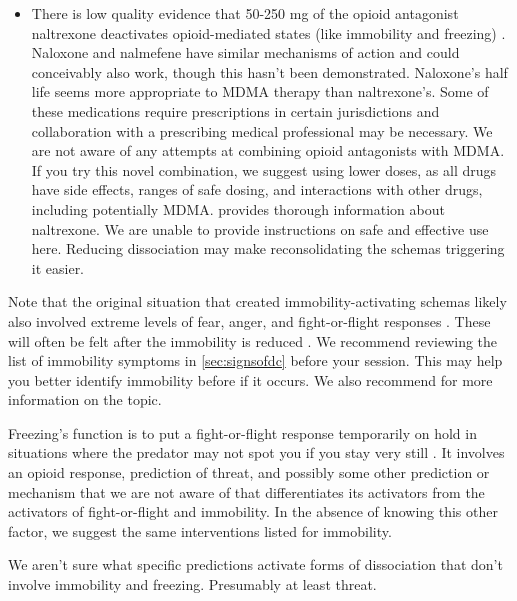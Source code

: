 \documentclass[12pt,letterpaper]{book}
\begin{document}
\begin{itemize}
	\item There is low quality evidence that 50-250 mg of the opioid antagonist naltrexone deactivates opioid-mediated states (like immobility and freezing) \cite{escamilla2023treatment}. Naloxone and nalmefene have similar mechanisms of action and could conceivably also work, though this hasn't been demonstrated. Naloxone's half life seems more appropriate to MDMA therapy than naltrexone's. Some of these medications require prescriptions in certain jurisdictions and collaboration with a prescribing medical professional may be necessary. We are not aware of any attempts at combining opioid antagonists with MDMA. If you try this novel combination, we suggest using lower doses, as all drugs have side effects, ranges of safe dosing, and interactions with other drugs, including potentially MDMA. \textcite{naltrexoneInfo} provides thorough information about naltrexone. We are unable to provide instructions on safe and effective use here. Reducing dissociation may make reconsolidating the schemas triggering it easier.
\end{itemize}
Note that the original situation that created immobility-activating schemas likely also involved extreme levels of fear, anger, and fight-or-flight responses \cite{kozlowskaDefenseCascade}. These will often be felt after the immobility is reduced \cite{razviPSIP}. We recommend reviewing the list of immobility symptoms in \ref{sec:signsofdc} before your session. This may help you better identify immobility before if it occurs. We also recommend \textcite{razviDissociation} for more information on the topic.

Freezing's function is to put a fight-or-flight response temporarily on hold in situations where the predator may not spot you if you stay very still \cite{kozlowskaDefenseCascade}. It involves an opioid response, prediction of threat, and possibly some other prediction or mechanism that we are not aware of that differentiates its activators from the activators of fight-or-flight and immobility. In the absence of knowing this other factor, we suggest the same interventions listed for immobility.

We aren't sure what specific predictions activate forms of dissociation that don't involve immobility and freezing. Presumably at least threat.
\end{document}
